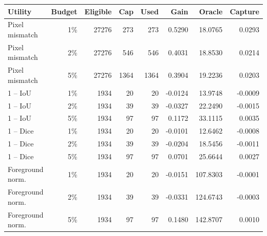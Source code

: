 \begin{center}
\begin{minipage}{\linewidth}
\centering
\small
\setlength{\tabcolsep}{4pt}
\label{tab:utility-sparse}
\begin{tabular}{lrrrrrrr}
\toprule
Utility & Budget & Eligible & Cap & Used & Gain & Oracle & Capture \\
\midrule
Pixel mismatch & 1\% & 27276 & 273 & 273 & 0.5290 & 18.0765 & 0.0293 \\
Pixel mismatch & 2\% & 27276 & 546 & 546 & 0.4031 & 18.8530 & 0.0214 \\
Pixel mismatch & 5\% & 27276 & 1364 & 1364 & 0.3904 & 19.2236 & 0.0203 \\
1 -- IoU & 1\% & 1934 & 20 & 20 & -0.0124 & 13.9748 & -0.0009 \\
1 -- IoU & 2\% & 1934 & 39 & 39 & -0.0327 & 22.2490 & -0.0015 \\
1 -- IoU & 5\% & 1934 & 97 & 97 & 0.1172 & 33.1115 & 0.0035 \\
1 -- Dice & 1\% & 1934 & 20 & 20 & -0.0101 & 12.6462 & -0.0008 \\
1 -- Dice & 2\% & 1934 & 39 & 39 & -0.0204 & 18.5456 & -0.0011 \\
1 -- Dice & 5\% & 1934 & 97 & 97 & 0.0701 & 25.6644 & 0.0027 \\
Foreground norm. & 1\% & 1934 & 20 & 20 & -0.0151 & 107.8303 & -0.0001 \\
Foreground norm. & 2\% & 1934 & 39 & 39 & -0.0331 & 124.6743 & -0.0003 \\
Foreground norm. & 5\% & 1934 & 97 & 97 & 0.1480 & 142.8707 & 0.0010 \\
\bottomrule
\end{tabular}
\end{minipage}
\end{center}
